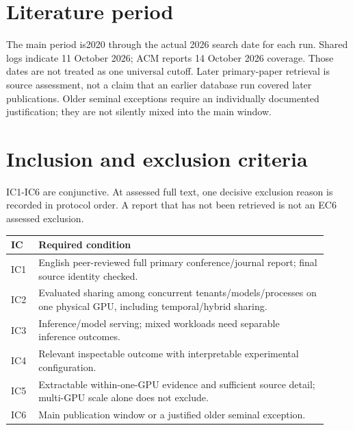 \documentclass[12pt,a4paper]{article}
\begin{document}
\section{Literature period}

The main period is2020 through the actual 2026 search date for each run. Shared logs indicate 11 October 2026; ACM reports 14 October 2026 coverage. Those dates are not treated as one universal cutoff. Later primary-paper retrieval is source assessment, not a claim that an earlier database run covered later publications. Older seminal exceptions require an individually documented justification; they are not silently mixed into the main window.



\section{Inclusion and exclusion criteria}

IC1-IC6 are conjunctive. At assessed full text, one decisive exclusion reason is recorded in protocol order. A report that has not been retrieved is not an EC6 assessed exclusion.



{\small\begin{longtable}{>{\raggedright\arraybackslash}p{0.08\linewidth}>{\raggedright\arraybackslash}p{0.84\linewidth}}
\toprule
IC & Required condition\\\midrule
\endhead
IC1 & English peer-reviewed full primary conference/\allowbreak{}journal report; final source identity checked.\\
IC2 & Evaluated sharing among concurrent tenants/\allowbreak{}models/\allowbreak{}processes on one physical GPU, including temporal/\allowbreak{}hybrid sharing.\\
IC3 & Inference/\allowbreak{}model serving; mixed workloads need separable inference outcomes.\\
IC4 & Relevant inspectable outcome with interpretable experimental configuration.\\
IC5 & Extractable within-one-GPU evidence and sufficient source detail; multi-GPU scale alone does not exclude.\\
IC6 & Main publication window or a justified older seminal exception.\\
\bottomrule
\end{longtable}}
\end{document}
